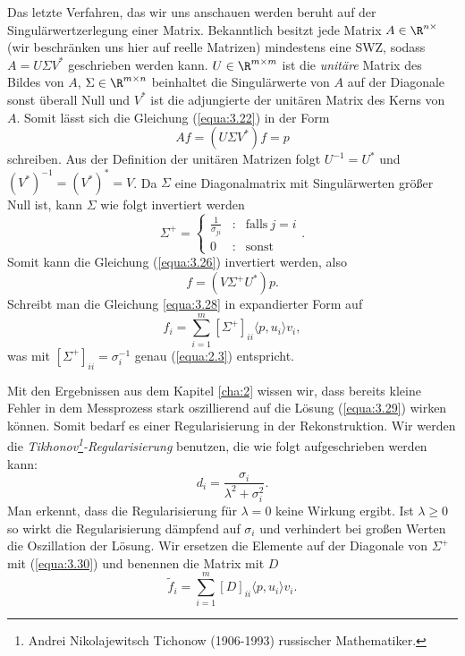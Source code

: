 Das letzte Verfahren, das wir uns anschauen werden beruht auf der Singulärwertzerlegung einer Matrix. Bekanntlich besitzt jede Matrix $A \in \R^{n\times}$ (wir beschränken uns hier auf reelle Matrizen) mindestens eine SWZ, sodass $A = U\Sigma V^{*}$ geschrieben werden kann. $U \in \R^{m\times m}$ ist die \textit{unitäre} Matrix des Bildes von $A$, $\Sigma \in \R^{m \times n}$ beinhaltet die Singulärwerte von $A$ auf der Diagonale sonst überall Null und $V^*$ ist die adjungierte der unitären Matrix des Kerns von $A$. Somit lässt sich die Gleichung (\ref{equa:3.22}) in der Form 
\begin{equation}
	Af = (U\Sigma V^*)f = p
	\label{equa:3.26}
\end{equation}
schreiben. Aus der Definition der unitären Matrizen folgt $U^{-1} = U^*$ und $(V^*)^{-1} = (V^*)^* = V$. Da $\Sigma$ eine Diagonalmatrix mit Singulärwerten größer Null ist, kann $\Sigma$ wie folgt invertiert werden
\begin{equation}
	\Sigma^+ = \left\{ \begin{matrix} \frac{1}{\sigma_{ji}} & : & \mbox{falls} \ j = i \\ 0 & : & \mbox{sonst} \end{matrix}\right. .
	\label{equa:3.27}
\end{equation}
Somit kann die Gleichung (\ref{equa:3.26}) invertiert werden, also
\begin{equation}
	f = (V\Sigma^+ U^*)p.
	\label{equa:3.28}
\end{equation}
Schreibt man die Gleichung \ref{equa:3.28} in expandierter Form auf
\begin{equation}
	f_i = \sum\limits_{i = 1}^{m}[\Sigma^+]_{ii} \langle p, u_i \rangle v_i,
	\label{equa:3.29}
\end{equation}
was mit $[\Sigma^+]_{ii} = \sigma^{-1}_{i}$ genau (\ref{equa:2.3}) entspricht. 

Mit den Ergebnissen aus dem Kapitel \ref{cha:2} wissen wir, dass bereits kleine Fehler in dem Messprozess stark oszillierend auf die Lösung (\ref{equa:3.29}) wirken können. Somit bedarf es einer Regularisierung in der Rekonstruktion. Wir werden die \textit{Tikhonov\footnote{Andrei Nikolajewitsch Tichonow (1906-1993) russischer Mathematiker.}-Regularisierung} benutzen, die wie folgt aufgeschrieben werden kann:
\begin{equation}
	d_i = \frac{\sigma_i}{\lambda^2 + \sigma_i^2}.
	\label{equa:3.30}
\end{equation}
Man erkennt, dass die Regularisierung für $\lambda = 0$ keine Wirkung ergibt. Ist $\lambda \geq 0$ so wirkt die Regularisierung dämpfend auf $\sigma_i$ und verhindert bei großen Werten die Oszillation der Lösung. Wir ersetzen die Elemente auf der Diagonale von $\Sigma^+$ mit (\ref{equa:3.30}) und benennen die Matrix mit $D$
\begin{equation}
	\tilde{f}_i = \sum\limits_{i = 1}^{m}[D]_{ii} \langle p, u_i \rangle v_i.
	\label{equa:3.31}
\end{equation} 

